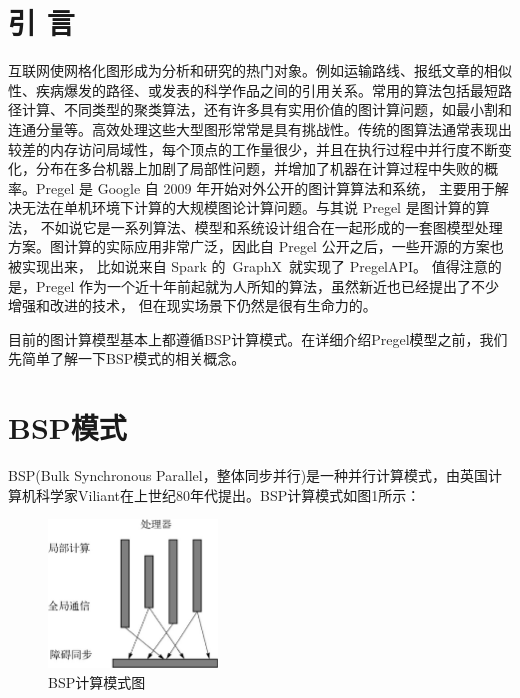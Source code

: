 \documentclass[10pt,a4paper,twocolumn,twoside,UTF8]{ctexart}
\begin{document}
\section{引 \quad 言}
互联网使网格化图形成为分析和研究的热门对象。例如运输路线、报纸文章的相似性、疾病爆发的路径、或发表的科学作品之间的引用关系。常用的算法包括最短路径计算、不同类型的聚类算法，还有许多具有实用价值的图计算问题，如最小割和连通分量等。高效处理这些大型图形常常是具有挑战性。传统的图算法通常表现出较差的内存访问局域性，每个顶点的工作量很少，并且在执行过程中并行度不断变化，分布在多台机器上加剧了局部性问题，并增加了机器在计算过程中失败的概率。Pregel 是 Google 自 2009 年开始对外公开的图计算算法和系统， 主要用于解决无法在单机环境下计算的大规模图论计算问题。与其说 Pregel 是图计算的算法， 不如说它是一系列算法、模型和系统设计组合在一起形成的一套图模型处理方案。图计算的实际应用非常广泛，因此自 Pregel 公开之后，一些开源的方案也被实现出来， 比如说来自 Spark 的 GraphX 就实现了 PregelAPI。 值得注意的是，Pregel 作为一个近十年前起就为人所知的算法，虽然新近也已经提出了不少增强和改进的技术， 但在现实场景下仍然是很有生命力的。\par
目前的图计算模型基本上都遵循BSP计算模式。在详细介绍Pregel模型之前，我们先简单了解一下BSP模式的相关概念。

\newpage
\section{BSP模式}
BSP(Bulk Synchronous Parallel，整体同步并行)是一种并行计算模式，由英国计算机科学家Viliant在上世纪80年代提出。BSP计算模式如图1所示：
	\begin{figure}[htbp]
		\centering
		\includegraphics[width=0.4\textwidth]{img//pic1.png}
		\caption{BSP计算模式图}
		\label{pic1}
	\end{figure}
	
\end{document}
